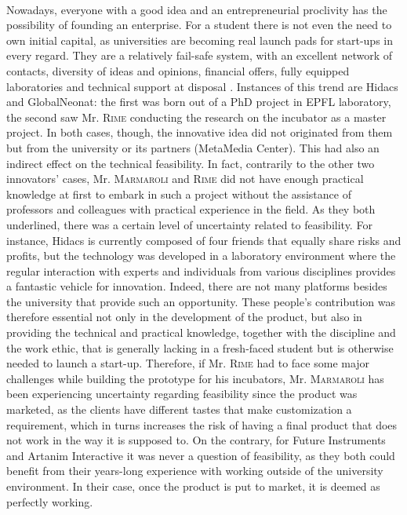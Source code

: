 \documentclass[twoside]{report}
\begin{document}
	\paragraph{}
	Nowadays, everyone with a good idea and an entrepreneurial proclivity has the possibility of founding an enterprise. For a student there is not even the need to own initial capital, as universities are becoming real launch pads for start-ups in every regard. They are a relatively fail-safe system, with an excellent network of contacts, diversity of ideas and opinions, financial offers, fully equipped laboratories and technical support at disposal \cite{stagars_university_2015}. Instances of this trend are Hidacs and GlobalNeonat: the first was born out of a PhD project in EPFL laboratory, the second saw Mr. \textsc{Rime} conducting the research on the incubator as a master project. In both cases, though, the innovative idea did not originated from them but from the university or its partners (MetaMedia Center). This had also an indirect effect on the technical feasibility. In fact, contrarily to the other two innovators' cases, Mr. \textsc{Marmaroli} and \textsc{Rime} did not have enough practical knowledge at first to embark in such a project without the assistance of professors and colleagues with practical experience in the field. As they both underlined, there was a certain level of uncertainty related to feasibility. For instance, Hidacs is currently composed of four friends that equally share risks and profits, but the technology was developed in a laboratory environment where the regular interaction with experts and individuals from various disciplines provides a fantastic vehicle for innovation. Indeed, there are not many platforms besides the university that provide such an opportunity. These people's contribution was therefore essential not only in the development of the product, but also in providing the technical and practical knowledge, together with the discipline and the work ethic, that is generally lacking in a fresh-faced student but is otherwise needed to launch a start-up. Therefore, if Mr. \textsc{Rime} had to face some major challenges while building the prototype for his incubators, Mr. \textsc{Marmaroli} has been experiencing uncertainty regarding feasibility since the product was marketed, as the clients have different tastes that make customization a requirement, which in turns increases the risk of having a final product that does not work in the way it is supposed to. On the contrary, for Future Instruments and Artanim Interactive it was never a question of feasibility, as they both could benefit from their years-long experience with working outside of the university environment. In their case, once the product is put to market, it is deemed as perfectly working.
\end{document}

